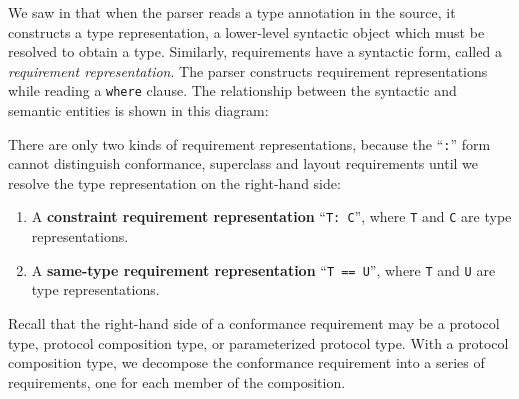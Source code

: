 \documentclass[../generics]{subfiles}
\begin{document}
We saw in  that when the parser reads a type annotation in the source, it constructs a type representation, a lower-level syntactic object which must be resolved to obtain a type. Similarly, requirements have a syntactic form, called a \emph{requirement representation}. The parser constructs requirement representations while reading a \texttt{where} clause. The relationship between the syntactic and semantic entities is shown in this diagram:
\begin{center}
\end{center}
There are only two kinds of requirement representations, because the ``\texttt{:}'' form cannot distinguish conformance, superclass and layout requirements until we resolve the type representation on the right-hand side:
\begin{enumerate}
\item A \textbf{constraint requirement representation} ``\texttt{T:\ C}'', where \texttt{T} and \texttt{C} are type representations.
\item A \textbf{same-type requirement representation} ``\texttt{T == U}'', where \texttt{T} and \texttt{U} are type representations.
\end{enumerate}

Recall that the right-hand side of a conformance requirement may be a protocol type, protocol composition type, or parameterized protocol type. With a protocol composition type, we decompose the conformance requirement into a series of requirements, one for each member of the composition.
\end{document}
